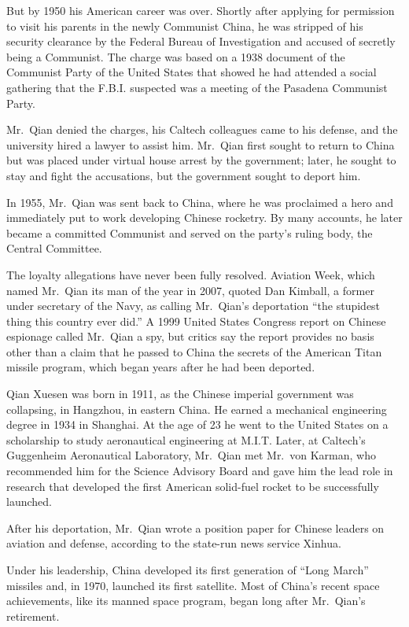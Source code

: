 ﻿\documentclass[12pt]{article}
\begin{document}
But by 1950 his American career was over. Shortly after applying for permission to visit his parents
in the newly Communist China, he was stripped of his security clearance by the Federal Bureau of
Investigation and accused of secretly being a Communist. The charge was based on a 1938 document of
the Communist Party of the United States that showed he had attended a social gathering that the
F.B.I. suspected was a meeting of the Pasadena Communist Party.

Mr.~Qian denied the charges, his Caltech colleagues came to his defense, and the university hired a
lawyer to assist him. Mr.~Qian first sought to return to China but was placed under virtual house
arrest by the government; later, he sought to stay and fight the accusations, but the government
sought to deport him.

In 1955, Mr.~Qian was sent back to China, where he was proclaimed a hero and immediately put to work
developing Chinese rocketry. By many accounts, he later became a committed Communist and served on
the party's ruling body, the Central Committee.

The loyalty allegations have never been fully resolved. Aviation Week, which named Mr.~Qian its man
of the year in 2007, quoted Dan Kimball, a former under secretary of the Navy, as calling Mr.~Qian's
deportation ``the stupidest thing this country ever did.'' A 1999 United States Congress report on
Chinese espionage called Mr.~Qian a spy, but critics say the report provides no basis other than a
claim that he passed to China the secrets of the American Titan missile program, which began years
after he had been deported.

Qian Xuesen was born in 1911, as the Chinese imperial government was collapsing, in Hangzhou, in
eastern China. He earned a mechanical engineering degree in 1934 in Shanghai. At the age of 23 he
went to the United States on a scholarship to study aeronautical engineering at M.I.T. Later, at
Caltech's Guggenheim Aeronautical Laboratory, Mr.~Qian met Mr.~von Karman, who recommended him for
the Science Advisory Board and gave him the lead role in research that developed the first American
solid-fuel rocket to be successfully launched.

After his deportation, Mr.~Qian wrote a position paper for Chinese leaders on aviation and defense,
according to the state-run news service Xinhua.

Under his leadership, China developed its first generation of ``Long March'' missiles and, in 1970,
launched its first satellite. Most of China's recent space achievements, like its manned space
program, began long after Mr.~Qian's retirement.
\end{document}
